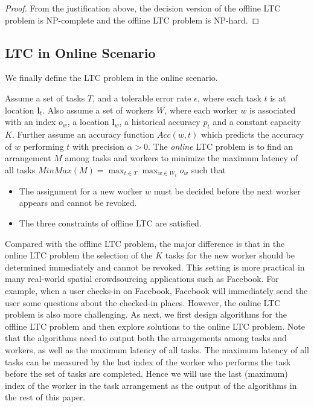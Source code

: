 \begin{proof}
From the justification above, the decision version of the offline LTC problem is NP-complete and the offline LTC problem is NP-hard.
\end{proof}

\subsection{LTC in Online Scenario}

We finally define the LTC problem in the online scenario.

\begin{definition}
Assume a set of tasks $T$, and a tolerable error rate $\epsilon$, where each task $t$ is at location $\boldsymbol{l}_t$.
Also assume a set of workers $W$, where each worker $w$ is associated with an index $o_w$, a location $\boldsymbol{l}_w$, a historical accuracy $p_t$ and a constant capacity $K$.
Further assume an accuracy function $Acc(w, t)$ which predicts the accuracy of $w$ performing $t$ with precision $\alpha > 0$.
The \textit{online} LTC problem is to find an arrangement $M$ among tasks and workers to minimize the maximum latency of all tasks
$MinMax(M) = \max_{t \in T}{\max_{w \in W_t} o_w}$ such that
\begin{itemize}
  \item The assignment for a new worker $w$ must be decided before the next worker appears and cannot be revoked.
  \item The three constraints of offline LTC are satisfied.
\end{itemize}
\end{definition}

Compared with the offline LTC problem, the major difference is that in the online LTC problem the selection of the $K$ tasks for the new worker should be determined immediately and cannot be revoked.
This setting is more practical in many real-world spatial crowdsourcing applications such as Facebook.
For example, when a user checks-in on Facebook, Facebook will immediately send the user some questions about the checked-in places.
However, the online LTC problem is also more challenging.
As next, we first design algorithms for the offline LTC problem and then explore solutions to the online LTC problem.
Note that the algorithms need to output both the arrangements among tasks and workers, as well as the maximum latency of all tasks.
The maximum latency of all tasks can be measured by the last index of the worker who performs the task before the set of tasks are completed.
Hence we will use the last (maximum) index of the worker in the task arrangement as the output of the algorithms in the rest of this paper.


